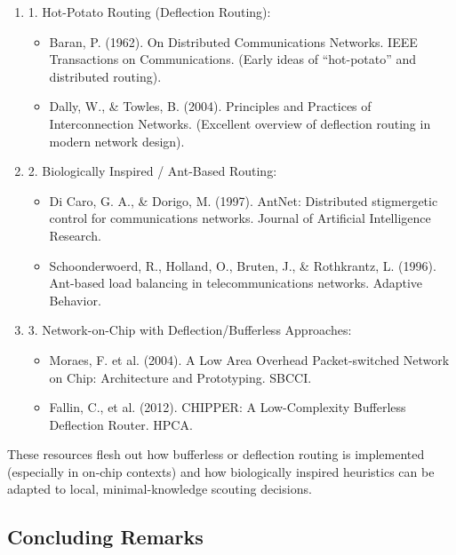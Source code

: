\documentclass[../../../OAE-SPEC-MAIN.tex]{subfiles}
\begin{document}
\begin{enumerate}
\item 	1.	Hot-Potato Routing (Deflection Routing):
	\begin{itemize}
	\item Baran, P. (1962). On Distributed Communications Networks. IEEE Transactions on Communications. (Early ideas of “hot-potato” and distributed routing).
	\item Dally, W., \& Towles, B. (2004). Principles and Practices of Interconnection Networks. (Excellent overview of deflection routing in modern network design).
 	\end{itemize}

\item 	2.	Biologically Inspired / Ant-Based Routing:
	\begin{itemize}
	\item Di Caro, G. A., \& Dorigo, M. (1997). AntNet: Distributed stigmergetic control for communications networks. Journal of Artificial Intelligence Research.
	\item Schoonderwoerd, R., Holland, O., Bruten, J., \& Rothkrantz, L. (1996). Ant-based load balancing in telecommunications networks. Adaptive Behavior.
	\end{itemize}
\item	3.	Network-on-Chip with Deflection/Bufferless Approaches:
	\begin{itemize}
	\item Moraes, F. et al. (2004). A Low Area Overhead Packet-switched Network on Chip: Architecture and Prototyping. SBCCI.
	\item Fallin, C., et al. (2012). CHIPPER: A Low-Complexity Bufferless Deflection Router. HPCA.
	\end{itemize}
\end{enumerate}

These resources flesh out how bufferless or deflection routing is implemented (especially in on-chip contexts) and how biologically inspired heuristics can be adapted to local, minimal-knowledge scouting decisions.

\subsection{Concluding Remarks}
\end{document}
